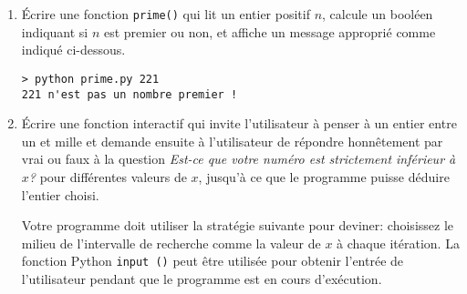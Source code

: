 \documentclass[a4paper]{article}
\begin{document}
\begin{enumerate}
\item Écrire une fonction {\tt prime()} qui lit un entier positif $n$, calcule un booléen indiquant si $n$ est premier ou non, et affiche un message approprié comme indiqué ci-dessous.
\begin{verbatim}
> python prime.py 221
221 n'est pas un nombre premier !
\end{verbatim}

\item Écrire une fonction interactif qui invite l'utilisateur à penser à un entier entre un et mille
et demande ensuite à l'utilisateur de répondre honnêtement par vrai ou faux à la question {\it Est-ce que votre numéro est strictement inférieur  à $x$? } pour différentes valeurs de $x$, jusqu'à ce que le programme puisse déduire l'entier choisi.

Votre programme doit utiliser la stratégie suivante pour deviner: choisissez le milieu de l'intervalle de recherche comme
la valeur de $x$ à chaque itération. La fonction Python {\tt input ()} peut être utilisée pour obtenir l'entrée de l'utilisateur pendant que le programme est en cours d'exécution.

\end{enumerate}
\end{document}
